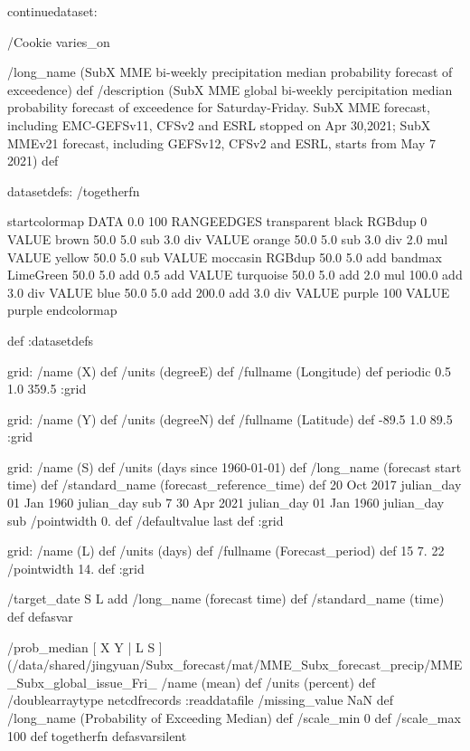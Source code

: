 \begin{ingrid}

continuedataset:


/Cookie varies_on


/long_name (SubX MME bi-weekly precipitation median probability forecast of exceedence) def
/description (SubX MME global bi-weekly percipitation median probability forecast of exceedence for Saturday-Friday. SubX MME forecast, including EMC-GEFSv11, CFSv2 and ESRL stopped on Apr 30,2021; SubX MMEv21 forecast, including GEFSv12, CFSv2 and ESRL, starts from May 7 2021) def

datasetdefs:
/togetherfn {
startcolormap 
DATA 0.0 100 RANGEEDGES
    transparent black RGBdup
       0 VALUE
       brown 50.0
         5.0 sub
         3.0 div
         VALUE
         orange 50.0
          5.0 sub
          3.0 div
          2.0 mul
          VALUE
          yellow 50.0
           5.0 sub
           VALUE
          moccasin RGBdup 50.0
             5.0 add
             bandmax
             LimeGreen 50.0
              5.0 add
              0.5 add
              VALUE
              turquoise 50.0
               5.0 add
               2.0 mul
               100.0 add
               3.0 div
               VALUE
               blue 50.0
                5.0 add
                200.0 add
                3.0 div
                VALUE
               purple
                100 VALUE
                purple
endcolormap

} def
:datasetdefs


grid:
/name (X) def
/units (degreeE) def
/fullname (Longitude) def
periodic
0.5 1.0 359.5
:grid

grid:
/name (Y) def
/units (degreeN) def
/fullname (Latitude) def
-89.5 1.0 89.5
:grid


grid:
/name (S) def
/units (days since 1960-01-01) def
/long_name (forecast start time) def
/standard_name (forecast_reference_time) def
20 Oct 2017 julian_day 01 Jan 1960 julian_day sub
7
30 Apr 2021 julian_day 01 Jan 1960 julian_day sub
/pointwidth 0. def
/defaultvalue { last } def
:grid

grid:
/name (L) def
/units (days) def
/fullname (Forecast_period) def
15 7. 22
/pointwidth 14. def
:grid

/target_date { S L add /long_name (forecast time) def /standard_name (time) def } defasvar


/prob_median {
[ X Y | L S ] (/data/shared/jingyuan/Subx_forecast/mat/MME_Subx_forecast_precip/MME_Subx_global_issue_Fri_%
/name (mean) def
/units (percent) def
/doublearraytype netcdfrecords :readdatafile
/missing_value NaN def
/long_name (Probability of Exceeding Median) def
/scale_min 0 def
/scale_max 100 def
togetherfn
} defasvarsilent


\end{ingrid}
